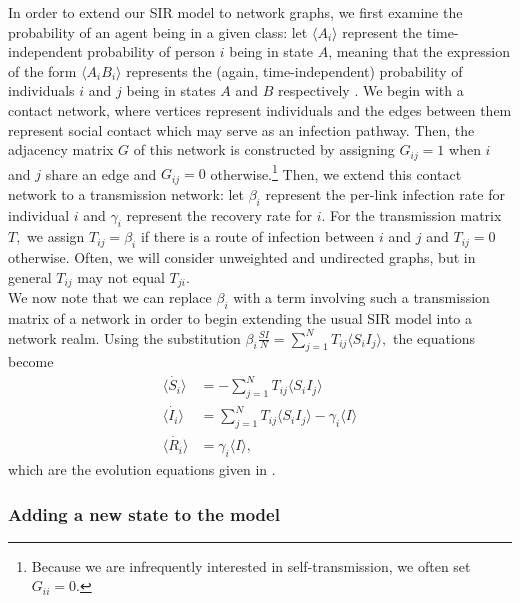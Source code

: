 \documentclass[../report.tex]{subfiles}
\begin{document}
In order to extend our SIR model to network graphs, we first examine the probability of an agent being in a given class: let $\langle A_i \rangle$ represent the time-independent probability of person $i$ being in state $A$, meaning that the expression of the form $\langle A_i B_i \rangle$ represents the (again, time-independent) probability of individuals $i$ and $j$ being in states $A$ and $B$ respectively \cite{kiss_2014}. We begin with a contact network, where vertices represent individuals and the edges between them represent social contact which may serve as an infection pathway. Then, the adjacency matrix $G$ of this network is constructed by assigning $G_{ij} = 1$ when $i$ and $j$ share an edge and $G_{ij} = 0$ otherwise.\footnote{Because we are infrequently interested in self-transmission, we often set $G_{ii}=0.$} Then, we extend this contact network to a transmission network: let $\beta_i$ represent the per-link infection rate for individual $i$ and $\gamma_i$ represent the recovery rate for $i$. For the transmission matrix $T,$ we assign $T_{ij}=\beta_i$ if there is a route of infection between $i$ and $j$ and $T_{ij}=0$ otherwise. Often, we will consider unweighted and undirected graphs, but in general $T_{ij}$ may not equal $T_{ji}$.\\
We now note that we can replace $\beta_i$ with a term involving such a transmission matrix of a network in order to begin extending the usual SIR model into a network realm. Using the substitution $ \beta_i \frac{SI}{N} = \sum^{N}_{j=1}T_{ij} \langle S_i I_j \rangle,$ the equations become
\begin{align*}
\dot{\langle S_i \rangle} & = -\sum^{N}_{j=1}T_{ij} \langle S_i I_j \rangle\\
\dot{\langle I_i \rangle} & =\sum^{N}_{j=1}T_{ij}\langle S_i I_j \rangle - \gamma_i \langle I \rangle \\
\dot{\langle R_i \rangle} & = \gamma_i \langle I \rangle,
\end{align*}
which are the evolution equations given in \cite{kiss_2014}.

\subsubsection{Adding a new state to the model}
\end{document}

